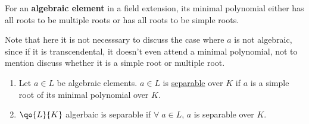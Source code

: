 \begin{conclusion}
	For an \textbf{algebraic element} in a field extension, its minimal polynomial either has all roots to be
	multiple roots or has all roots to be simple roots.
\end{conclusion}

\begin{note}
	Note that here it is not necesssary to discuss the case where \( a \) is not algebraic, since if
	it is transcendental, it doesn't even attend a minimal polynomial, not to mention discuss whether
	it is a simple root or multiple root.
\end{note}

\begin{definition}
	\leavevmode
	\begin{enumerate}
		\item Let \( a\in L \) be algebraic elements. \( a\in L \) is \underline{separable} over \( K \) if \( a \) is a simple root of
		      its minimal polynomial over \( K \).
		\item \( \qo{L}{K} \) algerbaic is separable if \( \forall \; a \in L \), \( a \) is separable
		      over \( K \).
	\end{enumerate}
\end{definition}

